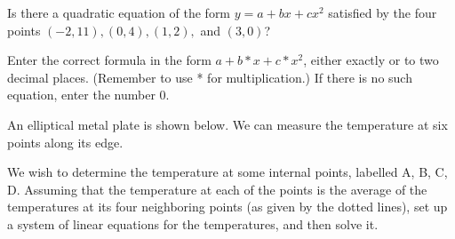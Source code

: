 \endedxproblem



Is there a quadratic equation of the form
$y = a + bx + cx^2 $ satisfied by the four points 
$(-2,11), (0,4), (1,2),$ and $(3,0)$?


Enter the correct formula in the form $a + b*x + c*x^2$, either exactly or to two decimal places.  (Remember to use * for multiplication.)  If there is no such equation, enter the number 0.  



\endedxproblem


An elliptical metal plate is shown below.  We can measure the temperature at six points along its edge.  

\begin{center}

\end{center}

We wish to determine the temperature at some internal points, labelled A, B, C, D.  Assuming that the temperature at each
of the points is the average of the temperatures at its four neighboring points (as given by the
dotted lines), set up a system of linear equations for the temperatures, and then solve it.  

